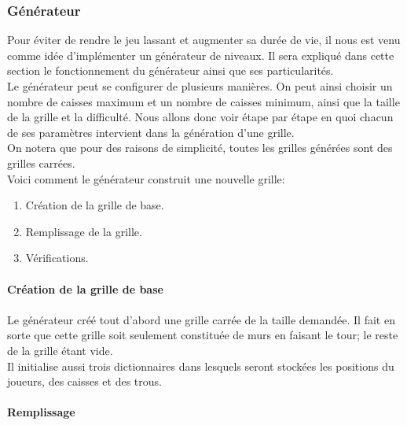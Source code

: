 \documentclass[a4paper,12pt]{article}
\begin{document}
\subsubsection{Générateur}
\label{gen}
Pour éviter de rendre le jeu lassant et augmenter sa durée de vie, il nous est venu comme idée d'implémenter un générateur de niveaux. Il sera expliqué dans cette section le fonctionnement du générateur ainsi que ses particularités. \\
Le générateur peut se configurer de plusieurs manières. On peut ainsi choisir un nombre de caisses maximum et un nombre de caisses minimum, ainsi que la taille de la grille et la difficulté. Nous allons donc voir étape par étape en quoi chacun de ses paramètres intervient dans la génération d'une grille.\\
On notera que pour des raisons de simplicité, toutes les grilles générées sont des grilles carrées.\\
Voici comment le générateur construit une nouvelle grille:
\begin{enumerate}
\item Création de la grille de base.
\item Remplissage de la grille.
\item Vérifications.
\end{enumerate}
\paragraph{Création de la grille de base}
\paragraph{}
Le générateur créé tout d'abord une grille carrée de la taille demandée. Il fait en sorte que cette grille soit seulement constituée de murs en faisant le tour; le reste de la grille étant vide.\\
Il initialise aussi trois dictionnaires dans lesquels seront stockées les positions du joueurs, des caisses et des trous.

\paragraph{Remplissage}
\end{document}
